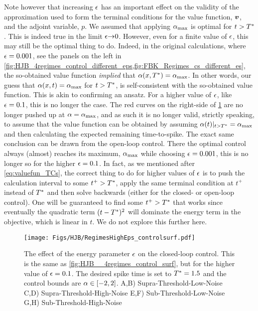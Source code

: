 Note however that increasing ${\epsilon}$ has an important effect on the validity of
the approximation used to form the terminal conditions for the value function,
${ \boldsymbol{v} }$, and the adjoint variable, $p$. We assumed that applying ${ \alpha_{\textrm{max}} }$ is optimal
for $t>{ T^* }$. This is indeed true in the limit ${\epsilon} {\rightarrow} 0$. However, even for a
finite value of ${\epsilon}$, this may still be the optimal thing to do. Indeed, in
the original calculations, where ${\epsilon}=0.001$, see the panels on the left in
\cref{fig:HJB_4regimes_control_different_eps,fig:FBK_Regimes_cs_different_es},
the so-obtained value function {\sl implied} that $\alpha(x,{ T^* }) = { \alpha_{\textrm{max}} }$. In other
words, our guess that $\alpha(x, t) = { \alpha_{\textrm{max}} }$ for $t > { T^* }$, is self-consistent with
the so-obtained value function. This is akin to confirming an ansatz. For a
higher value of ${\epsilon}$, like ${\epsilon} = 0.1$, this is no longer the case. The red
curves on the right-side of \cref{fig:HJB_4regimes_control_different_eps} are no
longer pushed up at $\alpha = { \alpha_{\textrm{max}} }$, and as such it is no longer valid, strictly
speaking, to assume that the value function can be obtained by assuming
$\alpha(t)|_{t>{ T^* }} = { \alpha_{\textrm{max}} }$ and then calculating the expected remaining
time-to-spike. The exact same conclusion can be drawn from the open-loop
control. There the optimal control always (almost) reaches its maximum, ${ \alpha_{\textrm{max}} }$
while choosing ${\epsilon} = 0.001$, this is no longer so for the higher ${\epsilon} = 0.1$.
In fact, as we mentioned after \cref{eq:valuefun_TCs}, the correct thing to do
for higher values of ${\epsilon}$ is to push the calculation interval to some $t^+ >
{ T^* }$, apply the same terminal condition at $t^+$ instead of ${ T^* }$ and then solve
backwards (either for the closed- or open-loop control). One will be guaranteed
to find some $t^+ > { T^* }$ that works since eventually the quadratic term
$(t-{ T^* })^2$ will dominate the energy term in the objective, which is linear in
$t$. We do not explore this further here.
\begin{figure}[htp]
\begin{center}
  \texttt{[image: Figs/HJB/RegimesHighEps\_controlsurf.pdf]}
  \caption[Value Function solution with higher energy-penalty]{The effect of the
  energy parameter ${\epsilon}$ on the closed-loop control. This is the same as \cref{fig:HJB__4regimes_control_surf}, but for
  the higher value of ${\epsilon} = 0.1$.
  The desired spike time is set to
  ${ T^* }=1.5$ and the control bounds are $\alpha \in [-2,2]$. 
  A,B)
   Supra-Threshold-Low-Noise 
  C,D) 
   Supra-Threshold-High-Noise 
  E,F)
   Sub-Threshold-Low-Noise 
  G,H)
   Sub-Threshold-High-Noise}
\label{fig:HJB_4regimes_control_different_eps} 
\end{center}
\end{figure}
